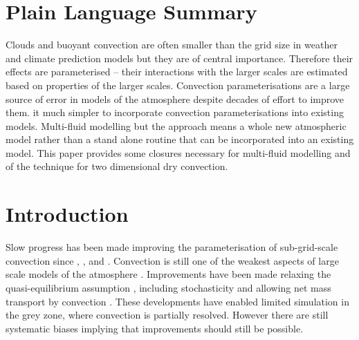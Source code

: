 \documentclass[draft]{agujournal2019}
\begin{document}
\section*{Plain Language Summary}
Clouds and buoyant convection are often smaller than the grid size in weather and climate prediction models but they are of central importance. Therefore their effects are parameterised -- their interactions with the larger scales are estimated based on properties of the larger scales. Convection parameterisations are a large source of error in models of the atmosphere despite decades of effort to improve them. 
it much simpler to incorporate convection parameterisations into existing models. 
Multi-fluid modelling
but the approach means a whole new atmospheric model rather than a stand alone routine that can be incorporated into an existing model. This paper provides some closures necessary for multi-fluid modelling and  of the technique for two dimensional dry convection.

\section{Introduction \label{sec:intro}}

Slow progress has been made improving the parameterisation of sub-grid-scale
convection since , ,  and . Convection is still
one of the weakest aspects of large scale models of the atmosphere
\cite{HPB+14,SAB+13,ipcc41}. Improvements have been made  relaxing
the quasi-equilibrium assumption \cite{PR98,GG05,Par14}, including
stochasticity \cite{PC08} and allowing net mass transport by convection
\cite{KB08,MB19}. These developments have enabled limited simulation
in the grey zone, where convection is partially resolved. However
there are still systematic biases implying that improvements should
still be possible.
\end{document}
